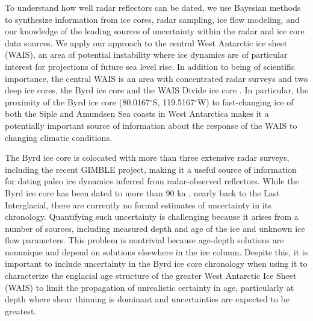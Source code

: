 To understand how well radar reflectors can be dated, we use Bayesian methods \citep{metropolis1953,hastings1970,gelfand1992} to synthesize information from ice cores, radar sampling, ice flow modeling, and our knowledge of the leading sources of uncertainty within the radar and ice core data sources. We apply our approach to the central West Antarctic ice sheet (WAIS), an area of potential instability where ice dynamics are of particular interest for projections of future sea level rise. In addition to being of scientific importance, the central WAIS is an area with concentrated radar surveys and two deep ice cores, the Byrd ice core \citep{gow1968} and the WAIS Divide ice core \citep{buizert2015}. In particular, the proximity of the Byrd ice core (80.0167$^\circ$S, 119.5167$^\circ$W) to fast-changing ice of both the Siple and Amundsen Sea coasts in West Antarctica makes it a potentially important source of information about the response of the WAIS to changing climatic conditions.


The Byrd ice core is colocated with more than three extensive radar surveys, including the recent GIMBLE project, making it a useful source of information for dating paleo ice dynamics inferred from radar-observed reflectors. While the Byrd ice core has been dated to more than 90 ka \citep{blunier2001}, nearly back to the Last Interglacial, there are currently no formal estimates of uncertainty in its chronology. Quantifying such uncertainty is challenging because it arises from a number of sources, including measured depth and age of the ice and unknown ice flow parameters. This problem is nontrivial because age-depth solutions are nonunique and depend on solutions elsewhere in the ice column. Despite this, it is important to include uncertainty in the Byrd ice core chronology when using it to characterize the englacial age structure of the greater West Antarctic Ice Sheet (WAIS) to limit the propagation of unrealistic certainty in age, particularly at depth where shear thinning is dominant and uncertainties are expected to be greatest. 

 

